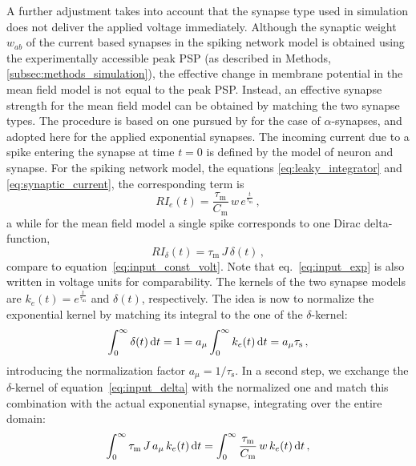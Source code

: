 A further adjustment takes into account that the synapse type used in simulation does not
deliver the applied voltage immediately. Although the synaptic weight $w_{ab}$ of the 
current based synapses in the spiking network model is obtained using the experimentally 
accessible peak PSP (as described in Methods, \autoref{subsec:methods_simulation}), 
the effective change in membrane potential in the mean field model is not equal to the peak PSP. 
Instead, an effective synapse strength for the mean field model can be obtained by 
matching the two synapse types.
The procedure is based on one pursued by 
for the case of $\alpha$-synapses, and adopted here for the applied 
exponential synapses. 
The incoming current due to a spike entering the synapse at time $t = 0$ is defined 
by the model of neuron and synapse. For the spiking network model, the equations 
\eqref{eq:leaky_integrator} and \eqref{eq:synaptic_current}, the corresponding term is
\begin{equation}
    RI_e(t) = \frac{\tau_\text{m}}{C_\text{m}} \,w \,e^{\frac{t}{\tau_\text{m}}}\,,
    \label{eq:input_exp}
\end{equation}a
while for the mean field model a single spike corresponds to one Dirac delta-function, 
\begin{equation}
    RI_\delta(t) = \tau_\text{m} \, J \,\delta(t)\,,
    \label{eq:input_delta}
\end{equation}
compare to equation~\eqref{eq:input_const_volt}. Note that eq.~\eqref{eq:input_exp} 
is also written in voltage units for 
comparability. The kernels of the two synapse models are $k_e(t) = e^{\frac{t}{\tau_\text{m}}}$
and $\delta(t)$, respectively. 
The idea is now to normalize the exponential kernel by matching its 
integral to the one of the $\delta$-kernel:
\begin{equation}
    \int_{0}^{\infty}\delta(t)\mathop{}\!\text{d} t 
        = 1 
        = a_\mu \int_{0}^{\infty}k_e(t)\mathop{}\!\text{d} t  
        = a_\mu \tau_\text{s} \,,
    \label{eq:match_k_e}
\end{equation}
introducing the normalization factor $a_\mu = 1 / \tau_\text{s} $. 
In a second step, we 
exchange the $\delta$-kernel of equation~\eqref{eq:input_delta}
with the normalized one
and match this combination with the actual 
exponential syn\-apse, integrating over the entire domain:
\begin{equation}
    \int_{0}^{\infty} \tau_\text{m} \,J \,a_\mu\, k_e(t) \mathop{}\!\text{d} t 
        = \int_{0}^{\infty} \frac{\tau_\text{m} }{C_\text{m}} \,w\, k_e(t)\mathop{}\!\text{d} t  \,,
    \label{eq:match_syns}
\end{equation}
